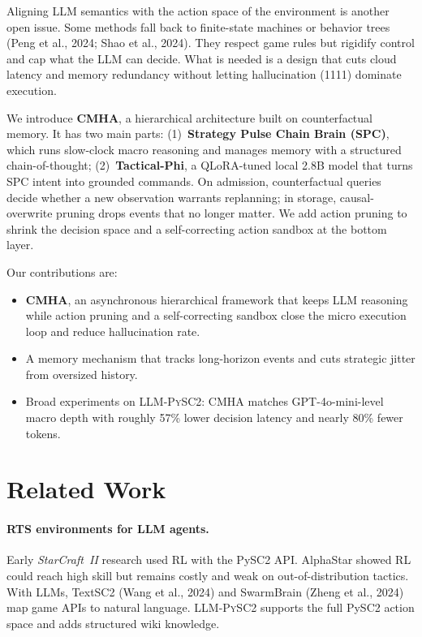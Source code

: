 \documentclass[11pt,a4paper]{article}
\begin{document}
Aligning LLM semantics with the action space of the environment is another open issue. Some methods fall back to finite-state machines or behavior trees (Peng et al., 2024; Shao et al., 2024). They respect game rules but rigidify control and cap what the LLM can decide. What is needed is a design that cuts cloud latency and memory redundancy without letting hallucination (1111) dominate execution.

We introduce \textbf{CMHA}, a hierarchical architecture built on counterfactual memory. It has two main parts: (1)~\textbf{Strategy Pulse Chain Brain (SPC)}, which runs slow-clock macro reasoning and manages memory with a structured chain-of-thought; (2)~\textbf{Tactical-Phi}, a QLoRA-tuned local 2.8B model that turns SPC intent into grounded commands. On admission, counterfactual queries decide whether a new observation warrants replanning; in storage, causal-overwrite pruning drops events that no longer matter. We add action pruning to shrink the decision space and a self-correcting action sandbox at the bottom layer.

Our contributions are:
\begin{itemize}
  \item \textbf{CMHA}, an asynchronous hierarchical framework that keeps LLM reasoning while action pruning and a self-correcting sandbox close the micro execution loop and reduce hallucination rate.
  \item A memory mechanism that tracks long-horizon events and cuts strategic jitter from oversized history.
  \item Broad experiments on \textsc{LLM-PySC2}: CMHA matches GPT-4o-mini-level macro depth with roughly 57\% lower decision latency and nearly 80\% fewer tokens.
\end{itemize}


\section{Related Work}

\paragraph{RTS environments for LLM agents.}
Early \textit{StarCraft~II} research used RL with the PySC2 API. AlphaStar \citep{vinyals2019} showed RL could reach high skill but remains costly and weak on out-of-distribution tactics. With LLMs, TextSC2 (Wang et al., 2024) and SwarmBrain (Zheng et al., 2024) map game APIs to natural language. \textsc{LLM-PySC2} \citep{ma2025} supports the full PySC2 action space and adds structured wiki knowledge.
\end{document}

